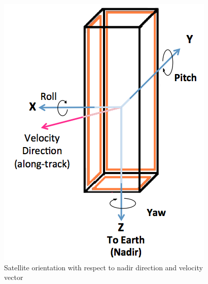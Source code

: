 \documentclass[12pt]{article}
\begin{document}
			\begin{figure}[!h]
				\centering
				\includegraphics[scale=0.5]{images/ADCS_coord.png}
				\caption{Satellite orientation with respect to nadir direction and velocity vector}
				\label{fig:ADCS_orientation}
			\end{figure}
\end{document}
